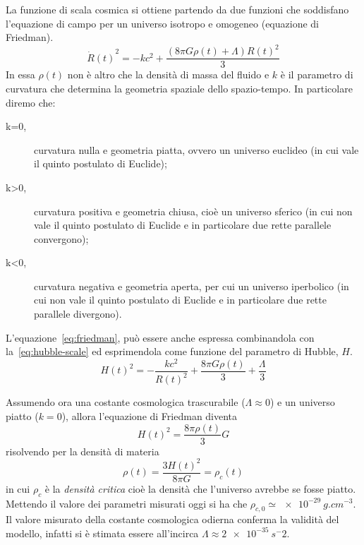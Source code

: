 La funzione di scala cosmica si ottiene partendo da due funzioni che soddisfano l'equazione di campo per un universo isotropo e omogeneo (equazione di Friedman).
\begin{equation}\label{eq:friedman}
    {\dot{R}(t)}^2 = -kc^2 + \frac{(8 \pi G \rho(t)+\Lambda) {R(t)}^2}{3}
\end{equation}
In essa $\rho(t)$ non è altro che la densità di massa del fluido e $k$ è il parametro di curvatura che determina la geometria spaziale dello spazio-tempo. In particolare diremo che:
\begin{description}
    \item[k=0,] curvatura nulla e geometria piatta, ovvero un universo euclideo (in cui vale il quinto postulato di Euclide);
    \item[k>0,] curvatura positiva e geometria chiusa, cioè un universo sferico (in cui non vale il quinto postulato di Euclide e in particolare due rette parallele convergono);
    \item[k<0,] curvatura negativa e geometria aperta, per cui un universo iperbolico  (in cui non vale il quinto postulato di Euclide e in particolare due rette parallele divergono).
\end{description}

L'equazione~\eqref{eq:friedman}, può essere anche espressa combinandola con la~\eqref{eq:hubble-scale} ed esprimendola come funzione del parametro di Hubble, $H$.
\begin{equation}\label{eq:friedman-hubble}
    {H(t)}^2 = - \frac{kc^2}{{R(t)}^2} + \frac{8\pi G \rho (t)}{3} + \frac{\Lambda}{3}
\end{equation}

Assumendo ora una costante cosmologica trascurabile ($\Lambda \approx 0$) e un universo piatto ($k = 0$), allora l'equazione di Friedman diventa
\[
    {H(t)}^2 = \frac{8 \pi \rho (t)}{3}G
\]
risolvendo per la densità di materia
\[
    \rho (t) = \frac{3 {H(t)}^2}{8 \pi G} = \rho_c (t)
\]
in cui $\rho_c$ è la \emph{densità critica} cioè la densità che l'universo avrebbe se fosse piatto. Mettendo il valore dei parametri misurati oggi si ha che $\rho_{c,0} \simeq \SI{e-29}{g.cm^{-3}}$. Il valore misurato della costante cosmologica odierna conferma la validità del modello, infatti si è stimata essere all'incirca $\Lambda \approx \SI{2e-35}{s^-2}$.

